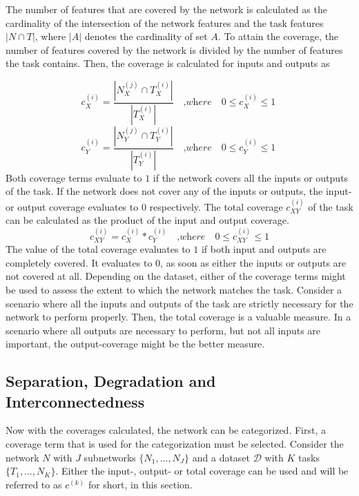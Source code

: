 The number of features that are covered by the network is calculated as the cardinality of the intersection of the network features and the task features $ |N \cap T|$, where  $|A|$ denotes the cardinality of set $A$.
To attain the coverage, the number of features covered by the network is divided by the number of features the task contains.
Then, the coverage is calculated for inputs and outputs as 

\[
c^{(i)}_X = \frac{|N^{(j)}_X  \cap T^{(i)}_X |}{|T^{(i)}_X|} \quad\textit{,where}\quad 0 \leq c^{(i)}_{X} \leq 1\
\]
\[
c^{(i)}_Y = \frac{|N^{(j)}_Y  \cap T^{(i)}_Y |}{|T^{(i)}_Y|} \quad\textit{,where}\quad 0 \leq c^{(i)}_{Y} \leq 1\
\]
Both coverage terms evaluate to $1$ if the network covers all the inputs or outputs of the task.
If the network does not cover any of the inputs or outputs, the input- or output coverage evaluates to $0$ respectively.
The total coverage $c^{(i)}_{XY}$ of the task can be calculated as the product of the input and output coverage.
\[ c^{(i)}_{XY} = c^{(i)}_{X} * c^{(i)}_{Y} \quad\textit{,where}\quad 0 \leq c^{(i)}_{XY} \leq 1\]
The value of the total coverage evaluates to $1$ if both input and outputs are completely covered.
It evaluates to $0$, as soon as either the inputs or outputs are not covered at all.
Depending on the dataset, either of the coverage terms might be used to assess the extent to which the network matches the task.
Consider a scenario where all the inputs and outputs of the task are strictly necessary for the network to perform properly.
Then, the total coverage is a valuable measure.
In a scenario where all outputs are necessary to perform, but not all inputs are important, the output-coverage might be the better measure.

\subsection{Separation, Degradation and Interconnectedness}
Now with the coverages calculated, the network can be categorized.
First, a coverage term that is used for the categorization must be selected.
Consider the network $N$ with $J$ subnetworks $\{N_1, \dots, N_J\}$ and a dataset $\mathcal{D}$ with $K$ tasks $\{T_1, \dots, N_K\}$.
Either the input-, output- or total coverage can be used and will be referred to as $c^{(k)}$ for short, in this section.

